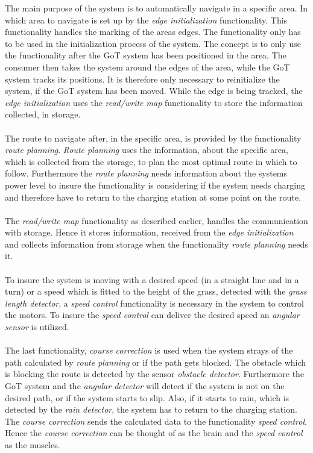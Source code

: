 \noindent
The main purpose of the system is to automatically navigate in a specific area. In which area to navigate is set up by the \textit{edge initialization} functionality. This functionality handles the marking of the areas edges. The functionality only has to be used in the initialization process of the system. The concept is to only use the functionality after the GoT system has been positioned in the area. The consumer then takes the system around the edges of the area, while the GoT system tracks its positions. It is therefore only necessary to reinitialize the system, if the GoT system has been moved. While the edge is being tracked, the \textit{edge initialization} uses the \textit{read/write map} functionality to store the information collected, in storage. \\\\ 
\noindent
The route to navigate after, in the specific area, is provided by the functionality \textit{route planning}. \textit{Route planning} uses the information, about the specific area, which is collected from the storage, to plan the most optimal route in which to follow. Furthermore the \textit{route planning} needs information about the systems power level to insure the functionality is considering if the system needs charging and therefore have to return to the charging station at some point on the route.\\\\
\noindent
The \textit{read/write map} functionality as described earlier, handles the communication with storage. Hence it stores information, received from the \textit{edge initialization} and collects information from storage when the functionality \textit{route planning} needs it. \\\\
\noindent
To insure the system is moving with a desired speed (in a straight line and in a turn) or a speed which is fitted to the height of the grass, detected with the \textit{grass length detector}, a \textit{speed control} functionality is necessary in the system to control the motors. To insure the \textit{speed control} can deliver the desired speed an \textit{angular sensor} is utilized. \\\\
\noindent
The last functionality, \textit{course correction} is used when the system strays of the path calculated by \textit{route planning} or if the path gets blocked.
The obstacle which is blocking the route is detected by the sensor \textit{obstacle detector}. Furthermore the GoT system and the \textit{angular detector} will detect if the system is not on the desired path, or if the system starts to slip. Also, if it starts to rain, which is detected by the \textit{rain detector}, the system has to return to the charging station.
The \textit{course correction} sends the calculated data to the functionality \textit{speed control}. Hence the \textit{course correction} can be thought of as the brain and the \textit{speed control} as the muscles.\\\\
